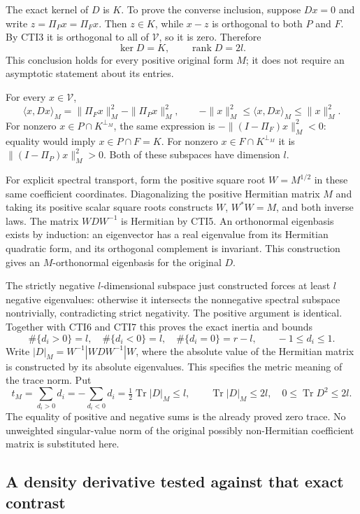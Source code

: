 The exact kernel of $D$ is $K$. To prove the converse inclusion,
suppose $Dx=0$ and write $z=\Pi_Px=\Pi_Fx$. Then $z\in K$,
while $x-z$ is orthogonal to both $P$ and $F$. By CTI3 it is
orthogonal to all of $\mathcal V$, so it is zero. Therefore
\[
 \ker D=K,\qquad \operatorname{rank}D=2l.
 \tag{CTI6}
\]
This conclusion holds for every positive original form $M$; it does
not require an asymptotic statement about its entries.

For every $x\in\mathcal V$,
\[
 \langle x,Dx\rangle_M
   =\|\Pi_Fx\|_M^2-\|\Pi_Px\|_M^2,
 \qquad -\|x\|_M^2\leq\langle x,Dx\rangle_M\leq\|x\|_M^2.
 \tag{CTI7}
\]
For nonzero $x\in P\cap K^{\perp_M}$, the same expression is
$-\|(I-\Pi_F)x\|_M^2<0$: equality would imply $x\in P\cap F=K$.
For nonzero $x\in F\cap K^{\perp_M}$ it is
$\|(I-\Pi_P)x\|_M^2>0$. Both of these subspaces have dimension $l$.

For explicit spectral transport, form the positive square root
$W=M^{1/2}$ in these same coefficient coordinates. Diagonalizing
the positive Hermitian matrix $M$ and taking its positive scalar
square roots constructs $W$, $W^*W=M$, and both inverse laws.
The matrix $WDW^{-1}$ is Hermitian by CTI5. An orthonormal
eigenbasis exists by induction: an eigenvector has a real eigenvalue
from its Hermitian quadratic form, and its orthogonal complement is
invariant. This construction gives an $M$-orthonormal eigenbasis
for the original $D$.

The strictly negative $l$-dimensional subspace just constructed
forces at least $l$ negative eigenvalues: otherwise it intersects
the nonnegative spectral subspace nontrivially, contradicting
strict negativity. The positive argument is identical. Together
with CTI6 and CTI7 this proves the exact inertia and bounds
\[
 \#\{d_i>0\}=l,\quad \#\{d_i<0\}=l,
 \quad\#\{d_i=0\}=r-l,
 \qquad -1\leq d_i\leq1.
 \tag{CTI8}
\]
Write $|D|_M=W^{-1}|WDW^{-1}|W$, where the absolute value of
the Hermitian matrix is constructed by its absolute eigenvalues.
This specifies the metric meaning of the trace norm. Put
\[
 t_M=\sum_{d_i>0}d_i=-\sum_{d_i<0}d_i
     =\tfrac12\operatorname{Tr}|D|_M\leq l,
 \qquad \operatorname{Tr}|D|_M\leq2l,
 \quad 0\leq\operatorname{Tr}D^2\leq2l.
 \tag{CTI9}
\]
The equality of positive and negative sums is the already proved
zero trace. No unweighted singular-value norm of the original
possibly non-Hermitian coefficient matrix is substituted here.

\subsection{A density derivative tested against that exact contrast}

